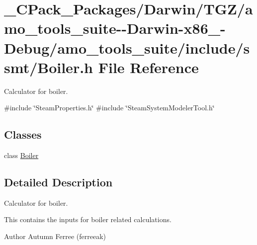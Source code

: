 \hypertarget{___c_pack___packages_2_darwin_2_t_g_z_2amo__tools__suite--_darwin-x86__64-_debug_2amo__tools__suite_2include_2ssmt_2_boiler_8h}{}\section{\+\_\+\+C\+Pack\+\_\+\+Packages/\+Darwin/\+T\+G\+Z/amo\+\_\+tools\+\_\+suite-\/-\/\+Darwin-\/x86\+\_-\/\+Debug/amo\+\_\+tools\+\_\+suite/include/ssmt/\+Boiler.h File Reference}
\label{___c_pack___packages_2_darwin_2_t_g_z_2amo__tools__suite--_darwin-x86__64-_debug_2amo__tools__suite_2include_2ssmt_2_boiler_8h}


Calculator for boiler.  


{\ttfamily \#include \char`\"{}Steam\+Properties.\+h\char`\"{}}\newline
{\ttfamily \#include \char`\"{}Steam\+System\+Modeler\+Tool.\+h\char`\"{}}\newline
\subsection*{Classes}
\begin{DoxyCompactItemize}
\item 
class \hyperlink{class_boiler}{Boiler}
\end{DoxyCompactItemize}


\subsection{Detailed Description}
Calculator for boiler. 

This contains the inputs for boiler related calculations.

\begin{DoxyAuthor}{Author}
Autumn Ferree (ferreeak) 
\end{DoxyAuthor}
